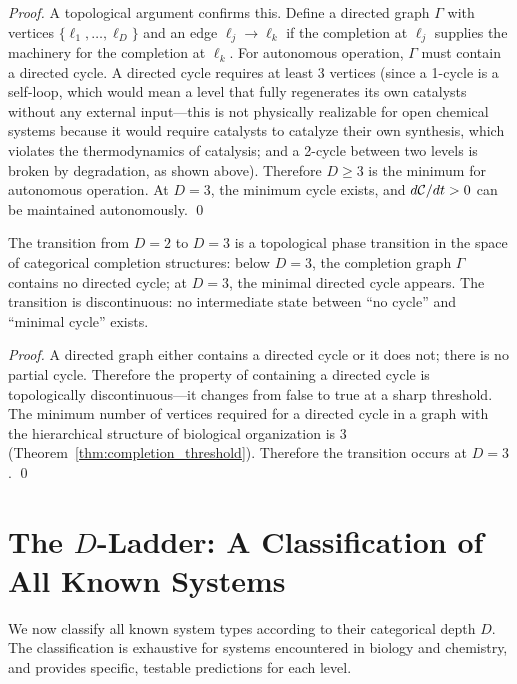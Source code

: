 \begin{proof}
A topological argument confirms this. Define a directed graph $\Gamma$ with
vertices $\{\ell_1, \ldots, \ell_D\}$ and an edge $\ell_j \to \ell_k$ if
the completion at $\ell_j$ supplies the machinery for the completion at $\ell_k$.
For autonomous operation, $\Gamma$ must contain a directed cycle. A directed
cycle requires at least 3 vertices (since a 1-cycle is a self-loop, which
would mean a level that fully regenerates its own catalysts without any external
input---this is not physically realizable for open chemical systems because it
would require catalysts to catalyze their own synthesis, which violates the
thermodynamics of catalysis; and a 2-cycle between two levels is broken by
degradation, as shown above). Therefore $D \geq 3$ is the minimum for
autonomous operation. At $D = 3$, the minimum cycle exists, and $d\mathcal{C}/dt > 0$
can be maintained autonomously. \qed
\end{proof}

\begin{corollary}
\label{cor:phase_transition}
The transition from $D = 2$ to $D = 3$ is a topological phase transition in
the space of categorical completion structures: below $D = 3$, the completion
graph $\Gamma$ contains no directed cycle; at $D = 3$, the minimal directed
cycle appears. The transition is discontinuous: no intermediate state between
``no cycle'' and ``minimal cycle'' exists.
\end{corollary}

\begin{proof}
A directed graph either contains a directed cycle or it does not; there is no
partial cycle. Therefore the property of containing a directed cycle is
topologically discontinuous---it changes from false to true at a sharp
threshold. The minimum number of vertices required for a directed cycle in a
graph with the hierarchical structure of biological organization is 3
(Theorem~\ref{thm:completion_threshold}). Therefore the transition occurs at
$D = 3$. \qed
\end{proof}

\section{The $D$-Ladder: A Classification of All Known Systems}
\label{sec:d_ladder}

We now classify all known system types according to their categorical depth
$D$. The classification is exhaustive for systems encountered in biology and
chemistry, and provides specific, testable predictions for each level.

